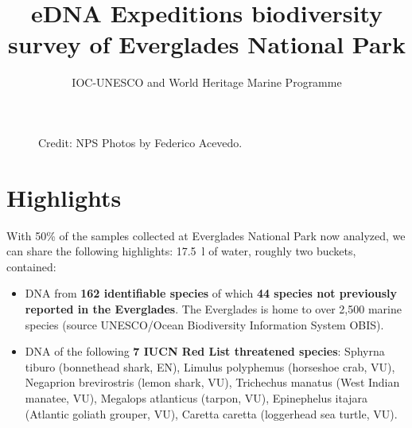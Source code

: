 \documentclass[10pt]{article}
\date{}
\title{eDNA Expeditions biodiversity survey of Everglades National Park}
\begin{document}
\author{IOC-UNESCO and World Heritage Marine Programme}

\maketitle

\begin{figure}[h]
 	\centering
 	\caption*{Credit: NPS Photos by Federico Acevedo.}
\end{figure}

\section*{Highlights}

With 50\% of the samples collected at Everglades National Park now analyzed, we can share the following highlights: \SI{17.5}{\litre} of water, roughly two buckets, contained:

\begin{itemize}
\item DNA from \textbf{162 identifiable species} of which \textbf{44 species not previously reported in the Everglades}. The Everglades is home to over 2,500 marine species (source UNESCO/Ocean Biodiversity Information System OBIS).
\item DNA of the following \textbf{7 IUCN Red List threatened species}: Sphyrna tiburo (bonnethead shark, EN), Limulus polyphemus (horseshoe crab, VU), Negaprion brevirostris (lemon shark, VU), Trichechus manatus (West Indian manatee, VU), Megalops atlanticus (tarpon, VU), Epinephelus itajara (Atlantic goliath grouper, VU), Caretta caretta (loggerhead sea turtle, VU).
\end{itemize}
\end{document}
